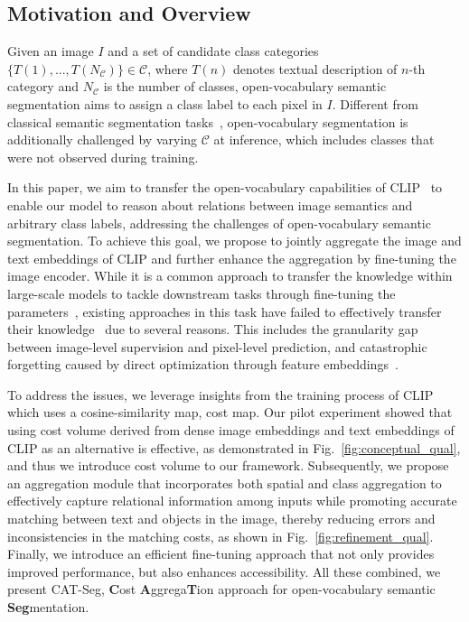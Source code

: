 \documentclass[10pt,twocolumn,letterpaper]{article}
\newcommand{\ours}{CAT-Seg\xspace}
\begin{document}
\subsection{Motivation and Overview}\label{motivation}
Given an image $I$ and a set of candidate class categories $\{T(1), ..., T({N_\mathcal{C}})\} \in \mathcal{C}$, where $T(n)$ denotes textual description of $n$-th category and $N_\mathcal{C}$ is the number of classes, open-vocabulary semantic segmentation aims to assign a class label to each pixel in $I$. Different from classical semantic segmentation tasks~\cite{long2015fully, he2017mask, zhou2022rethinking, he2019adaptive, jin2021mining, yu2020context, yuan2020object}, open-vocabulary segmentation is additionally challenged by varying $\mathcal{C}$ at inference, which includes classes that were not observed during training. 

In this paper, we aim to transfer the open-vocabulary capabilities of CLIP~\cite{radford2021learning} to enable our model to reason about relations between image semantics and arbitrary class labels, addressing the challenges of open-vocabulary semantic segmentation. To achieve this goal, we propose to jointly aggregate the image and text embeddings of CLIP and further enhance the aggregation by fine-tuning the image encoder. While it is a common approach to transfer the knowledge within large-scale models to tackle downstream tasks through fine-tuning the parameters~\cite{he2017mask,mensink2021factors}, existing approaches in this task have failed to effectively transfer their knowledge~\cite{zhou2022extract} due to several reasons. This includes the granularity gap between image-level supervision and pixel-level prediction, and catastrophic forgetting caused by direct optimization through feature embeddings~\cite{zhou2022extract}.

To address the issues, we leverage insights from the training process of CLIP~\cite{radford2021learning} which uses a cosine-similarity map, \ie cost map.
Our pilot experiment showed that using cost volume derived from dense image embeddings and text embeddings of CLIP as an alternative is effective, as demonstrated in Fig.~\ref{fig:conceptual_qual}, and thus  we introduce cost volume to our framework.
Subsequently, we propose an aggregation module that incorporates both spatial and class aggregation to effectively capture relational information among inputs while promoting accurate matching between text and objects in the image, thereby reducing errors and inconsistencies in the matching costs, as shown in Fig.~\ref{fig:refinement_qual}. Finally, we introduce an efficient fine-tuning approach that not only provides improved performance, but also enhances accessibility. All these combined, we present \ours, \textbf{C}ost \textbf{A}ggrega\textbf{T}ion approach for open-vocabulary semantic \textbf{Seg}mentation.
\end{document}
